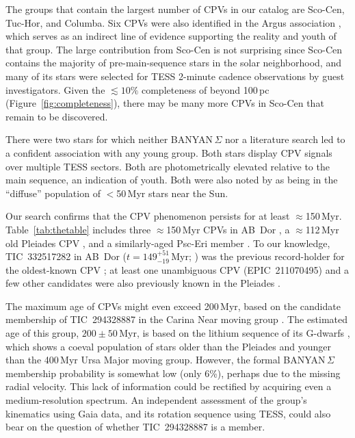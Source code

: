 \documentclass[11pt,twocolumn,tighten]{aastex63}
\begin{document}
The groups that contain the largest number of CPVs in our catalog are
Sco-Cen, Tuc-Hor, and Columba.  Six CPVs were also identified in the
Argus association \citep{2019ApJ...870...27Z}, which serves as an
indirect line of evidence supporting the reality and youth of that
group.  The large contribution from Sco-Cen is not surprising since
Sco-Cen contains the majority of pre-main-sequence stars in the solar
neighborhood, and many of its stars were selected for TESS 2-minute
cadence observations by guest investigators.  Given the
$\lesssim$$10\%$ completeness of  beyond 100\,pc
(Figure~\ref{fig:completeness}), there may be many more CPVs in
Sco-Cen that remain to be discovered.

There were two stars for which neither BANYAN\,$\Sigma$ nor a
literature search led to a confident association with any young group.
Both stars display CPV signals over multiple TESS sectors. Both are
photometrically elevated relative to the main sequence, an indication
of youth.  Both were also noted by \citet{2021ApJ...917...23K} as
being in the ``diffuse'' population of $<$50\,Myr stars near the Sun.

Our search confirms that the CPV phenomenon persists for at least
$\approx$150\,Myr.  Table~\ref{tab:thetable} includes three
$\approx$150\,Myr CPVs in AB~Dor \citep{2015MNRAS.454..593B}, a
$\approx$112\,Myr old Pleiades CPV \citep{2015ApJ...813..108D}, and a
similarly-aged Psc-Eri member \citep{2020A&A...639A..64R}.  To our
knowledge, TIC~332517282 in AB~Dor ($t$$=$$149^{+51}_{-19}$\,Myr;
\citealt{2015MNRAS.454..593B}) was the previous record-holder for the
oldest-known CPV \citep{2019ApJ...876..127Z,2022AJ....163..144G}; at
least one unambiguous CPV (EPIC~211070495) and a few other candidates
were also previously known in the Pleiades
\citep{2016AJ....152..114R}.  

The maximum age of CPVs might even exceed 200\,Myr, based on the
candidate membership of TIC~294328887 in the Carina Near moving group
\citep{2006ApJ...649L.115Z}.  The estimated age of this group, $200
\pm 50$\,Myr, is based on the lithium sequence of its G-dwarfs
\citep{2006ApJ...649L.115Z}, which shows a coeval population of stars
older than the Pleiades and younger than the 400\,Myr Ursa Major
moving group.  However, the formal BANYAN\,$\Sigma$ membership
probability is somewhat low (only 6\%), perhaps due to the missing
radial velocity.  This lack of information could be rectified by
acquiring even a medium-resolution spectrum.  An independent
assessment of the group's kinematics using Gaia data, and its rotation
sequence using TESS, could also bear on the question of whether
TIC~294328887 is a member.
\end{document}
